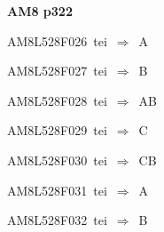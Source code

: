 \par\vfill\eject
{\bf\hfill AM8 p322\hfill\hbox{}}\par\bigskip
{\sixrm AM8L528F026\ {\sixit tei}\ }$\Rightarrow$\ A\par\smallskip
{\sixrm AM8L528F027\ {\sixit tei}\ }$\Rightarrow$\ B\par\smallskip
{\sixrm AM8L528F028\ {\sixit tei}\ }$\Rightarrow$\ AB\par\smallskip
{\sixrm AM8L528F029\ {\sixit tei}\ }$\Rightarrow$\ C\par\smallskip
{\sixrm AM8L528F030\ {\sixit tei}\ }$\Rightarrow$\ CB\par\smallskip
{\sixrm AM8L528F031\ {\sixit tei}\ }$\Rightarrow$\ A\par\smallskip
{\sixrm AM8L528F032\ {\sixit tei}\ }$\Rightarrow$\ B\par\smallskip
\bye
